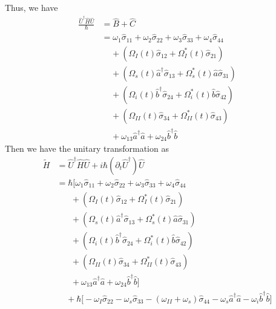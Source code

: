 \documentclass[aps,pra,showpacs,amsmath,amssymb,nofootinbib,longbibliography,superscriptaddress
]{revtex4-1}
\theoremstyle{definition}
\theoremstyle{remark}
\newcommand{\0}{\hat{0}}
\begin{document}
Thus, we have
\begin{align}
    \frac{\hat{U}^{\dagger} \hat{H} \hat{U}}{\hbar}
    &=
    \hat{B} + \hat{C} \nonumber\\
    &=
    \omega_1 \hat{\sigma}_{11} + \omega_2 \hat{\sigma}_{22} + \omega_3 \hat{\sigma}_{33} + \omega_4 \hat{\sigma}_{44} \nonumber \\
    &\;\;\;\;+
    \left(
        \Omega_{I}(t) \hat{\sigma}_{12} +
        \Omega_{I}^*(t) \hat{\sigma}_{21}
    \right)\nonumber \\
    &\;\;\;\;+
    \left(
        \Omega_{s}(t) \hat{a}^{\dagger} \hat{\sigma}_{13} +
        \Omega_{s}^*(t) \hat{a} \hat{\sigma}_{31}
    \right) \nonumber \\
    &\;\;\;\;+
    \left(
        \Omega_{i}(t) \hat{b}^{\dagger} \hat{\sigma}_{24} +
        \Omega_{i}^*(t) \hat{b} \hat{\sigma}_{42}
    \right) \nonumber \\
    &\;\;\;\;+
    \left(
        \Omega_{II}(t) \hat{\sigma}_{34}
        + \Omega_{II}^*(t) \hat{\sigma}_{43}
    \right) \nonumber \\
    &\;\;\;\;+
    \omega_{13} \hat{a}^{\dagger}\hat{a} +
    \omega_{24} \hat{b}^{\dagger}\hat{b}
\end{align}
Then we have the unitary transformation as
\begin{align}
    \tilde{H}
    &=
    \hat{U}^{\dagger} \hat{H} \hat{U} + i \hbar (\partial_t \hat{U}^{\dagger}) \hat{U} \nonumber \\
    &=
    \hbar \biggl[
        \omega_1 \hat{\sigma}_{11} +
        \omega_2 \hat{\sigma}_{22} +
        \omega_3 \hat{\sigma}_{33} +
        \omega_4 \hat{\sigma}_{44} \nonumber \\
        &\;\;\;\;\;\;+
        \left(
            \Omega_{I}(t) \hat{\sigma}_{12} +
            \Omega_{I}^*(t) \hat{\sigma}_{21}
        \right)\nonumber \\
        &\;\;\;\;\;\;+
        \left(
            \Omega_{s}(t) \hat{a}^{\dagger} \hat{\sigma}_{13} +
            \Omega_{s}^*(t) \hat{a} \hat{\sigma}_{31}
        \right) \nonumber \\
        &\;\;\;\;\;\;+
        \left(
            \Omega_{i}(t) \hat{b}^{\dagger} \hat{\sigma}_{24} +
            \Omega_{i}^*(t) \hat{b} \hat{\sigma}_{42}
        \right) \nonumber \\
        &\;\;\;\;\;\;+
        \left(
            \Omega_{II}(t) \hat{\sigma}_{34} +
            \Omega_{II}^*(t) \hat{\sigma}_{43}
        \right) \nonumber \\
        &\;\;\;\;\;\;+
        \omega_{13} \hat{a}^{\dagger}\hat{a} +
        \omega_{24} \hat{b}^{\dagger}\hat{b}
    \biggr]\nonumber \\
    &\;\;\;\;+
    \hbar \biggl[
        -\omega_I \hat{\sigma}_{22} -
        \omega_s \hat{\sigma}_{33} -
        (\omega_{II} + \omega_s) \hat{\sigma}_{44} -
        \omega_s \hat{a}^{\dagger} \hat{a} -
        \omega_i \hat{b}^{\dagger} \hat{b}
    \biggr] \nonumber
\end{align}
\end{document}
